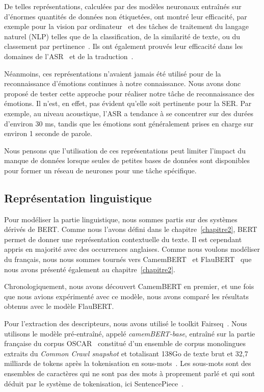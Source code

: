 De telles représentations, calculées par des modèles neuronaux entraînés sur d'énormes quantités de données non étiquetées, ont montré leur efficacité, par exemple pour la vision par ordinateur~\cite{Nanni2017} et des tâches de traitement du langage naturel (NLP) telles que de la
classification, de la similarité de texte, ou du classement par pertinence~\cite{Liu2019,Young2018,Yang2019}. Ils ont également prouvés leur efficacité dans les domaines de l'ASR~\cite{Kahn2020,Liu2020} et de la traduction~\cite{Nguyen2020}.

Néanmoins, ces représentations n'avaient jamais été utilisé pour de la reconnaissance d'émotions continues à notre connaissance. Nous avons donc proposé de tester cette approche pour réaliser notre tâche de reconnaissance des émotions. Il n'est, en effet, pas évident qu'elle soit pertinente pour la SER. Par exemple, au niveau acoustique, l'ASR a tendance à se concentrer \textcolor{bleu}{sur des durées d'environ 30 ms}, tandis que les émotions sont généralement prises en charge sur environ 1 seconde de parole.

Nous pensons que l'utilisation de ces représentations peut limiter l'impact du manque de données lorsque seules de petites bases de données sont disponibles pour former un réseau de neurones pour une tâche spécifique.

\subsection{Représentation linguistique}
Pour modéliser la partie linguistique, nous sommes partis sur des systèmes dérivés de BERT. Comme nous l'avons défini dans le chapitre~\ref{chapitre2}, BERT permet de donner une représentation contextuelle du texte. Il est cependant appris en majorité avec des occurrences anglaises. Comme nous voulons modéliser du français, nous nous sommes tournés vers CamemBERT~\cite{Martin2020} et FlauBERT~\cite{Le2020} que nous avons présenté également au chapitre~\ref{chapitre2}.

Chronologiquement, nous avons découvert CamemBERT en premier, et une fois que nous avions expérimenté avec ce modèle, nous avons comparé les résultats obtenus avec le modèle FlauBERT.

Pour l'extraction des descripteurs, nous avons utilisé le toolkit Fairseq~\cite{Ott2019}. Nous utilisons le modèle pré-entraîné, appelé \textit{camemBERT-base}, entraîné sur la partie française du corpus OSCAR~\cite{Ortizsuarez2019} constitué d'un ensemble de corpus monolingues extraits du \textit{Common Crawl snapshot} et totalisant 138Go de texte brut et 32,7 milliards de tokens après la tokenisation en sous-mots~\cite{Wu2016}. Les sous-mots sont des ensembles de caractères qui ne sont pas des mots à proprement parlé et qui sont déduit par le système de tokenisation, ici SentencePiece~\cite{Kudo2018}.

